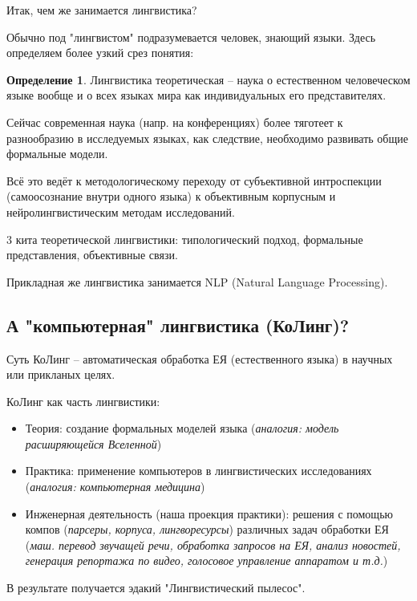 \documentclass[a4paper,12pt]{article}
\theoremstyle{plain} %
\theoremstyle{definition} %
\newtheorem{definition}{Определение}
\theoremstyle{remark} %
\begin{document}
	Итак, чем же занимается лингвистика?
	
	Обычно под "лингвистом" подразумевается человек, знающий языки.	Здесь определяем более узкий срез понятия: 
	
	\begin{definition}
		 Лингвистика теоретическая -- наука о естественном человеческом языке вообще и о всех языках мира как индивидуальных его представителях.
	\end{definition}
	
	Сейчас современная наука (напр. на конференциях) более тяготеет к разнообразию в исследуемых языках, как следствие, необходимо развивать общие формальные модели.
	
	Всё это ведёт к методологическому переходу от субъективной интроспекции (самоосознание внутри одного языка) к объективным корпусным и нейролингвистическим методам исследований.
	
	3 кита теоретической лингвистики: типологический подход, формальные представления, объективные связи. %
	
	Прикладная же лингвистика занимается NLP (Natural Language Processing).
	
	\subsection { А "компьютерная" лингвистика (КоЛинг)?}
	
	Суть КоЛинг -- автоматическая обработка ЕЯ (естественного языка) в научных или прикланых целях.
	
	КоЛинг как часть лингвистики:
	
	\begin{itemize}
		\item Теория: создание формальных моделей языка ({\it аналогия: модель расширяющейся Вселенной})
	
		\item Практика: применение компьютеров в лингвистических исследованиях ({\it аналогия: компьютерная медицина})
	
		\item Инженерная деятельность (наша проекция практики): решения с помощью компов ({\it парсеры, корпуса, лингворесурсы}) различных задач обработки ЕЯ ({\it маш. перевод звучащей речи, обработка запросов на ЕЯ, анализ новостей, генерация репортажа по видео, голосовое управление аппаратом и т.д.})
	\end{itemize}
	
	
	В результате получается эдакий "Лингвистический пылесос".
	
\end{document}
